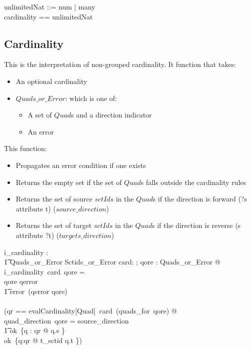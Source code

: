 \documentclass{article}
\begin{document}
\begin{zed}
unlimitedNat ::= num \ldata \nat \rdata | many \\
cardinality == \nat \cross unlimitedNat \\
\end{zed}

\subsection{Cardinality}
This is the interpretation of non-grouped cardinality.   It function that takes:
\begin{itemize}[noitemsep,nolistsep]
\item An optional cardinality
\item $Quads\_or\_Error$: which is one of:
\begin{itemize}[noitemsep,nolistsep]
\item A set of $Quad$s and a direction indicator
\item An error
\end{itemize}
\end{itemize}

This function:
\begin{itemize}[noitemsep,nolistsep]
\item Propagates an error condition if one exists
\item Returns the empty set if the set of $Quad$s falls outside the cardinality rules
\item Returns the set of source $sctIds$ in the $Quad$s if the direction is forward (?s attribute t) ($source\_direction$)
\item Returns the set of target $sctIds$ in the $Quad$s if the direction is reverse (s attribute ?t) ($targets\_direction$)
\end{itemize}

\begin{gendef}
   i\_cardinality :  \\
\t1 \optional[cardinality] \fun Quads\_or\_Error \fun  Sctids\_or\_Error
\where
   \forall card: \optional[cardinality]; qore : Quads\_or\_Error  @ \\
i\_cardinality~card~qore = \\
\IF qore \in \ran qerror \\
\t1 \THEN error~(qerror \inv qore) \\
\ELSE  \\
   (\LET qr == evalCardinality[Quad]~card~(quads\_for~qore) @ \\
\IF quad\_direction~qore = source\_direction \\
\t1 \THEN ok~\{q : qr @ q.s \} \\
\ELSE ok~\{q:qr @ t\_sctid \inv q.t \})
\end{gendef}
\end{document}

